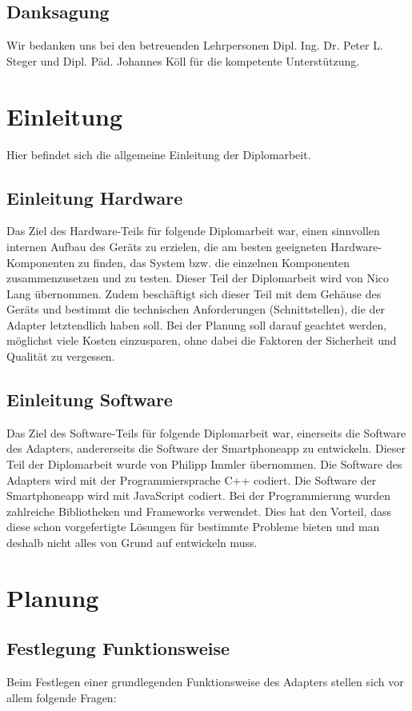 \documentclass[]{article}
\begin{document}
\subsection{Danksagung}
Wir bedanken uns bei den betreuenden Lehrpersonen Dipl. Ing. Dr. Peter L. Steger und Dipl. Päd. Johannes Köll für die kompetente Unterstützung.
\tableofcontents

\section{Einleitung}
Hier befindet sich die allgemeine Einleitung der Diplomarbeit.

\subsection{Einleitung Hardware}
Das Ziel des Hardware-Teils für folgende Diplomarbeit war, einen sinnvollen internen Aufbau des Geräts zu erzielen, die am besten geeigneten Hardware-Komponenten zu finden, das System bzw. die einzelnen Komponenten zusammenzusetzen und zu testen. Dieser Teil der Diplomarbeit wird von Nico Lang übernommen.
Zudem beschäftigt sich dieser Teil mit dem Gehäuse des Geräts und bestimmt die technischen Anforderungen (Schnittstellen), die der Adapter letztendlich haben soll. 
Bei der Planung soll darauf geachtet werden, möglichst viele Kosten einzusparen, ohne dabei die Faktoren der Sicherheit und Qualität zu vergessen.

\subsection{Einleitung Software}
Das Ziel des Software-Teils für folgende Diplomarbeit war, einerseits die Software des Adapters, andererseits die Software der Smartphoneapp zu entwickeln. Dieser Teil der Diplomarbeit wurde von Philipp Immler übernommen. Die Software des Adapters wird mit der Programmiersprache C++ codiert. Die Software der Smartphoneapp wird mit JavaScript codiert. Bei der Programmierung wurden zahlreiche Bibliotheken und Frameworks verwendet. Dies hat den Vorteil, dass diese schon vorgefertigte Lösungen für bestimmte Probleme bieten und man deshalb nicht alles von Grund auf entwickeln muss. 

\section{Planung}
\subsection{Festlegung Funktionsweise}
Beim Festlegen einer grundlegenden Funktionsweise des Adapters stellen sich vor allem folgende Fragen:
\end{document}
